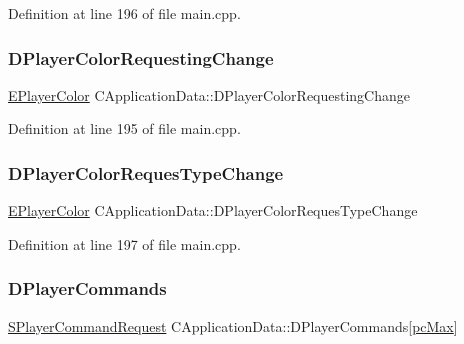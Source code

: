 Definition at line 196 of file main.\+cpp.

\hypertarget{classCApplicationData_a5231cd0c9d8bb76ab32c7f2a114e41f1}{}\label{classCApplicationData_a5231cd0c9d8bb76ab32c7f2a114e41f1} 
\subsubsection{\texorpdfstring{D\+Player\+Color\+Requesting\+Change}{DPlayerColorRequestingChange}}
{\footnotesize\ttfamily \hyperlink{GameDataTypes_8h_aafb0ca75933357ff28a6d7efbdd7602f}{E\+Player\+Color} C\+Application\+Data\+::\+D\+Player\+Color\+Requesting\+Change\hspace{0.3cm}{\ttfamily [protected]}}



Definition at line 195 of file main.\+cpp.

\hypertarget{classCApplicationData_a6724e09974db5fe5f147d9898f468dbc}{}\label{classCApplicationData_a6724e09974db5fe5f147d9898f468dbc} 
\subsubsection{\texorpdfstring{D\+Player\+Color\+Reques\+Type\+Change}{DPlayerColorRequesTypeChange}}
{\footnotesize\ttfamily \hyperlink{GameDataTypes_8h_aafb0ca75933357ff28a6d7efbdd7602f}{E\+Player\+Color} C\+Application\+Data\+::\+D\+Player\+Color\+Reques\+Type\+Change\hspace{0.3cm}{\ttfamily [protected]}}



Definition at line 197 of file main.\+cpp.

\hypertarget{classCApplicationData_a2df1addeb7622233f72dc056bbcf31a1}{}\label{classCApplicationData_a2df1addeb7622233f72dc056bbcf31a1} 
\subsubsection{\texorpdfstring{D\+Player\+Commands}{DPlayerCommands}}
{\footnotesize\ttfamily \hyperlink{structSPlayerCommandRequest}{S\+Player\+Command\+Request} C\+Application\+Data\+::\+D\+Player\+Commands\mbox{[}\hyperlink{GameDataTypes_8h_aafb0ca75933357ff28a6d7efbdd7602fa594a5c8dd3987f24e8a0f23f1a72cd34}{pc\+Max}\mbox{]}\hspace{0.3cm}{\ttfamily [protected]}}



